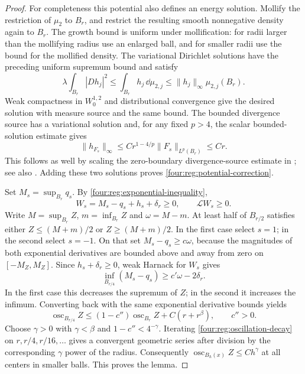 \begin{proof}
For completeness this potential also defines an energy solution.
Mollify the restriction of $\mu_2$ to $B_r$, and restrict the
resulting smooth nonnegative density again to $B_r$.  The growth
bound is uniform under mollification: for radii larger than the
mollifying radius use an enlarged ball, and for smaller radii use
the bound for the mollified density.  The variational Dirichlet
solutions have the preceding uniform supremum bound and satisfy
\[
 \lambda\int_{B_r}|Dh_j|^2
 \le\int_{B_r}h_j\,\dd\mu_{2,j}
 \le\|h_j\|_\infty\mu_{2,j}(B_r).
\]
Weak compactness in $W^{1,2}_0$ and distributional convergence
give the desired solution with measure source and the same bound.
The bounded divergence source has a variational solution and, for
any fixed $p>4$, the scalar bounded-solution estimate gives
\[
 \|h_{F_s}\|_\infty
 \le Cr^{1-4/p}\|F_s\|_{L^p(B_r)}\le Cr.
\]
This follows as well by scaling the zero-boundary divergence-source
estimate in \cite[Theorem~2.6, p.~50]{LittmanStampacchiaWeinberger1963}; see also \cite{GilbargTrudinger2001}. Adding these two solutions proves
\eqref{four:reg:potential-correction}.

Set $M_s=\sup_{B_r}q_s$.  By
\eqref{four:reg:exponential-inequality},
\[
 W_s=M_s-q_s+h_s+\delta_r\ge0,\qquad \mathcal LW_s\ge0.
\]
Write $M=\sup_{B_r}Z$, $m=\inf_{B_r}Z$ and $\omega=M-m$.
At least half of $B_{r/2}$ satisfies either $Z\le(M+m)/2$ or
$Z\ge(M+m)/2$.  In the first case select $s=1$; in the second
select $s=-1$.  On that set $M_s-q_s\ge c\omega$, because the
magnitudes of both exponential derivatives are bounded above and
away from zero on $[-M_Z,M_Z]$.  Since $h_s+\delta_r\ge0$,
weak Harnack for $W_s$ gives
\[
 \inf_{B_{r/4}}(M_s-q_s)\ge c'\omega-2\delta_r.
\]
In the first case this decreases the supremum of $Z$; in the second
it increases the infimum.  Converting back with the same exponential
derivative bounds yields
\begin{equation}\label{four:reg:oscillation-decay}
 \operatorname{osc}_{B_{r/4}}Z
 \le (1-c'')\operatorname{osc}_{B_r}Z+C(r+r^\beta),
                       \qquad c''>0.
\end{equation}
Choose $\gamma>0$ with $\gamma<\beta$ and
$1-c''<4^{-\gamma}$.  Iterating \eqref{four:reg:oscillation-decay}
on $r, r/4,r/16,\ldots$ gives a convergent geometric series after
division by the corresponding $\gamma$ power of the radius.
Consequently $\operatorname{osc}_{B_h(x)}Z\le Ch^\gamma$ at all
centers in smaller balls.  This proves the lemma.
\end{proof}

